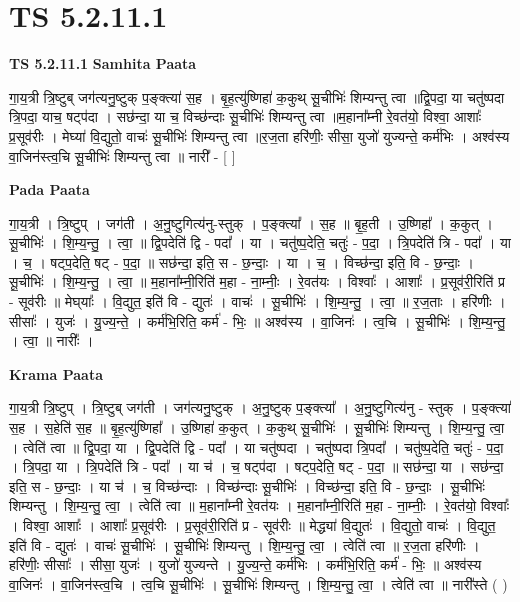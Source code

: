 \documentclass[17pt]{extarticle}
\begin{document}
\section{ TS 5.2.11.1 }

\textbf{TS 5.2.11.1 } \newline
\textbf{Samhita Paata} \newline

गा॒य॒त्री त्रि॒ष्टुब् जग॑त्यनु॒ष्टुक् प॒ङ्क्त्या॑ स॒ह । बृ॒ह॒त्यु॑ष्णिहा॑ क॒कुथ् सू॒चीभिः॑ शिम्यन्तु त्वा ॥द्वि॒पदा॒ या चतु॑ष्पदा त्रि॒पदा॒ याच॒ षट्प॑दा । सछ॑न्दा॒ या च॒ विच्छ॑न्दाः सू॒चीभिः॑ शिम्यन्तु त्वा ॥म॒हाना᳚म्नी रे॒वत॑यो॒ विश्वा॒ आशाः᳚ प्र॒सूव॑रीः । मेघ्या॑ वि॒द्युतो॒ वाचः॑ सू॒चीभिः॑ शिम्यन्तु त्वा ॥र॒ज॒ता हरि॑णीः॒ सीसा॒ युजो॑ युज्यन्ते॒ कर्म॑भिः । अश्व॑स्य वा॒जिन॑स्त्व॒चि सू॒चीभिः॑ शिम्यन्तु त्वा ॥ नारी᳚ - [  ] \newline

\textbf{Pada Paata} \newline

गा॒य॒त्री । त्रि॒ष्टुप् । जग॑ती । अ॒नु॒ष्टुगित्य॑नु-स्तुक् । प॒ङ्क्त्या᳚ । स॒ह ॥ बृ॒ह॒ती । उ॒ष्णिहा᳚ । क॒कुत् । सू॒चीभिः॑ । शि॒म्य॒न्तु॒ । त्वा॒ ॥ द्वि॒पदेति॑ द्वि - पदा᳚ । या । चतु॑ष्प॒देति॒ चतुः॑ - प॒दा॒ । त्रि॒पदेति॑ त्रि - पदा᳚ । या । च॒ । षट्प॒देति॒ षट् - प॒दा॒ ॥ सछ॑न्दा॒ इति॒ स - छ॒न्दाः॒ । या । च॒ । विच्छ॑न्दा॒ इति॒ वि - छ॒न्दाः॒ । सू॒चीभिः॑ । शि॒म्य॒न्तु॒ । त्वा॒ ॥ म॒हाना᳚म्नी॒रिति॑ म॒हा - ना॒म्नीः॒ । रे॒वत॑यः । विश्वाः᳚ । आशाः᳚ । प्र॒सूव॑री॒रिति॑ प्र - सूव॑रीः ॥ मेघ्‌याः᳚ । वि॒द्युत॒ इति॑ वि - द्युतः॑ । वाचः॑ । सू॒चीभिः॑ । शि॒म्य॒न्तु॒ । त्वा॒ ॥ र॒ज॒ताः । हरि॑णीः । सीसाः᳚ । युजः॑ । यु॒ज्य॒न्ते॒ । कर्म॑भि॒रिति॒ कर्म॑ -  भिः॒ ॥ अश्व॑स्य । वा॒जिनः॑ । त्व॒चि । सू॒चीभिः॑ । शि॒म्य॒न्तु॒ । त्वा॒ ॥ नारीः᳚ ।  \newline


\textbf{Krama Paata} \newline

गा॒य॒त्री त्रि॒ष्टुप् । त्रि॒ष्टुब् जग॑ती । जग॑त्यनु॒ष्टुक् । अ॒नु॒ष्टुक् प॒ङ्क्त्या᳚ । अ॒नु॒ष्टुगित्य॑नु - स्तुक् । प॒ङ्क्त्या॑ स॒ह । स॒हेति॑ स॒ह ॥ बृ॒ह॒त्यु॑ष्णिहा᳚ । उ॒ष्णिहा॑ क॒कुत् । क॒कुथ् सू॒चीभिः॑ । सू॒चीभिः॑ शिम्यन्तु । शि॒म्य॒न्तु॒ त्वा॒ । त्वेति॑ त्वा ॥ द्वि॒पदा॒ या । द्वि॒पदेति॑ द्वि - पदा᳚ । या चतु॑ष्पदा । चतु॑ष्पदा त्रि॒पदा᳚ । चतु॑ष्प॒देति॒ चतुः॑ - प॒दा॒ । त्रि॒पदा॒ या । त्रि॒पदेति॑ त्रि - पदा᳚ । या च॑ । च॒ षट्प॑दा । षट्प॒देति॒ षट् - प॒दा॒ ॥ सछ॑न्दा॒ या । सछ॑न्दा॒ इति॒ स - छ॒न्दाः॒ । या च॑ । च॒ विच्छ॑न्दाः । विच्छ॑न्दाः सू॒चीभिः॑ । विच्छ॑न्दा॒ इति॒ वि - छ॒न्दाः॒ । सू॒चीभिः॑ शिम्यन्तु । शि॒म्य॒न्तु॒ त्वा॒ । त्वेति॑ त्वा ॥ म॒हाना᳚म्नी रे॒वत॑यः । म॒हाना᳚म्नी॒रिति॑ म॒हा - ना॒म्नीः॒ । रे॒वत॑यो॒ विश्वाः᳚ । विश्वा॒ आशाः᳚ । आशाः᳚ प्र॒सूव॑रीः । प्र॒सूव॑री॒रिति॑ प्र - सूव॑रीः ॥ मेद्ध्या॑ वि॒द्युतः॑ । वि॒द्युतो॒ वाचः॑ । वि॒द्युत॒ इति॑ वि - द्युतः॑ । वाचः॑ सू॒चीभिः॑ । सू॒चीभिः॑ शिम्यन्तु । शि॒म्य॒न्तु॒ त्वा॒ । त्वेति॑ त्वा ॥ र॒ज॒ता हरि॑णीः । हरि॑णीः॒ सीसाः᳚ । सीसा॒ युजः॑ । युजो॑ युज्यन्ते । यु॒ज्य॒न्ते॒ कर्म॑भिः । कर्म॑भि॒रिति॒ कर्म॑ - भिः॒ ॥ अश्व॑स्य वा॒जिनः॑ । वा॒जिन॑स्त्व॒चि । त्व॒चि सू॒चीभिः॑ । सू॒चीभिः॑ शिम्यन्तु । शि॒म्य॒न्तु॒ त्वा॒ । त्वेति॑ त्वा ॥ नारी᳚स्ते ( ) \newline
\end{document}
